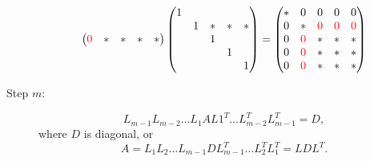 \documentclass[ComputationalMathematics.tex]{subfiles}
\begin{document}
\begin{description}
\[\begin{pmatrix}
    {\color{red} 0} & \ast & \ast & \ast & \ast\\
\end{pmatrix}
\begin{pmatrix}
    1\\
    & 1 & \ast & \ast & \ast\\
    & & 1\\
    & & & 1\\
    & & & &1\\
\end{pmatrix}
=
\begin{pmatrix}
	\ast & 0 & 0 & 0 & 0\\
	0 & \ast & {\color{red} 0} & {\color{red} 0} & {\color{red} 0}\\
	0 & {\color{red} 0} & \ast & \ast & \ast\\
	0 & {\color{red} 0} & \ast & \ast & \ast\\
	0 & {\color{red} 0} & \ast & \ast & \ast\\
\end{pmatrix}
\]

\item[{\sc Step $m$:}] 
  \[
L_{m-1}L_{m-2}\dots L_1 A L1^T \dots L_{m-2}^T L_{m-1}^T = D,
\]
where $D$ is diagonal, or
\[
A = L_1 L_2 \dots L_{m-1} D L_{m-1}^T \dots L_2^T L_1^T = LDL^T.
\]
\end{description}
\end{document}
